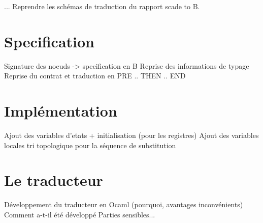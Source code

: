 

...
Reprendre les schémas de traduction du rapport scade to B.

\section{Specification}
Signature des noeuds -> specification en B
Reprise des informations de typage
Reprise du contrat et traduction en PRE .. THEN .. END


\section{Implémentation}
Ajout des variables d'etats + initialisation (pour les registres)
Ajout des variables locales
tri topologique pour la séquence de substitution

\section{Le traducteur}
Développement du traducteur en Ocaml (pourquoi, avantages
inconvénients)
Comment a-t-il été développé
Parties sensibles...
